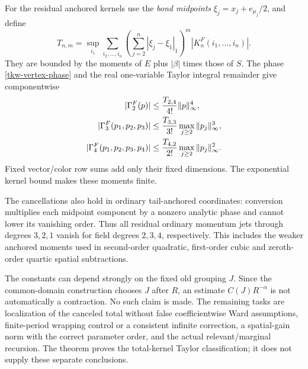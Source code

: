 For the residual anchored kernels use the \emph{bond midpoints}
\(\xi_j=x_j+e_{\mu_j}/2\), and define
\begin{equation}
 T_{n,m}=\sup_{i_1}\sum_{i_2,\ldots,i_n}
  \left(\sum_{j=2}^n|\xi_j-\xi_1|_1\right)^m
                  |K_n^F(i_1,\ldots,i_n)|.
 \label{tkw-moments}
\end{equation}
They are bounded by the moments of \(E\) plus
\(|\beta|\) times those of \(S\). The phase
\eqref{tkw-vertex-phase} and the real one-variable
Taylor integral remainder give componentwise
\begin{align}
 |\Gamma_2^F(p)|
   &\le \frac{T_{2,4}}{4!}\|p\|_\infty^4,\notag\\
 |\Gamma_3^F(p_1,p_2,p_3)|
   &\le \frac{T_{3,3}}{3!}
                  \max_{j\ge2}\|p_j\|_\infty^3,\notag\\
 |\Gamma_4^F(p_1,p_2,p_3,p_4)|
   &\le \frac{T_{4,2}}{2!}
                  \max_{j\ge2}\|p_j\|_\infty^2 .
 \label{tkw-quantitative}
\end{align}
Fixed vector/color row sums add only their fixed dimensions.
The exponential kernel bound makes these moments finite.

The cancellations also hold in ordinary tail-anchored
coordinates: conversion multiplies each midpoint component
by a nonzero analytic phase and cannot lower its vanishing
order. Thus all residual ordinary momentum jets through
degrees \(3,2,1\) vanish for field degrees \(2,3,4\),
respectively. This includes the weaker anchored moments
used in second-order quadratic, first-order cubic and
zeroth-order quartic spatial subtractions.

The constants can depend strongly on the fixed old grouping
\(J\). Since the common-domain construction chooses \(J\)
after \(R\), an estimate \(C(J)R^{-\alpha}\) is not
automatically a contraction. No such claim is made.
The remaining tasks are localization of the canceled
total without false coefficientwise Ward assumptions,
finite-period wrapping control or a consistent infinite
correction, a spatial-gain norm with the correct parameter
order, and the actual relevant/marginal recursion.
The theorem proves the total-kernel Taylor classification;
it does not supply these separate conclusions.
